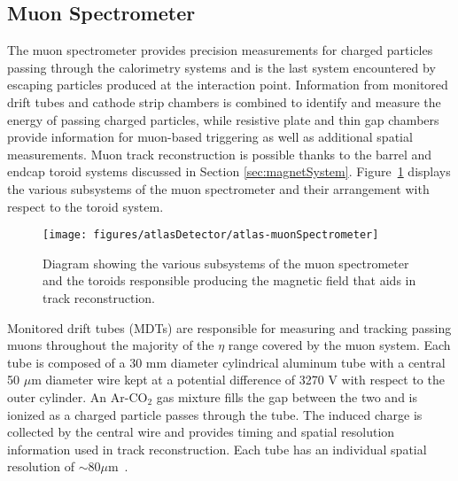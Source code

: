 
\subsection{Muon Spectrometer}
The muon spectrometer provides precision measurements for charged particles passing through the calorimetry systems and is the last system encountered by escaping particles produced at the interaction point. Information from monitored drift tubes and cathode strip chambers is combined to identify and measure the energy of passing charged particles, while resistive plate and thin gap chambers provide information for muon-based triggering as well as additional spatial measurements. Muon track reconstruction is possible thanks to the barrel and endcap toroid systems discussed in Section \ref{sec:magnetSystem}. Figure~\ref{fig:atlas-muonSpectrometer} displays the various subsystems of the muon spectrometer and their arrangement with respect to the toroid system.

\begin{figure}[h!]
\centering
\label{fig:atlas-muonSpectrometer}
\texttt{[image: figures/atlasDetector/atlas-muonSpectrometer]}
\caption{Diagram showing the various subsystems of the muon spectrometer and the toroids responsible producing the magnetic field that aids in track reconstruction.}
\end{figure}

Monitored drift tubes (MDTs) are responsible for measuring and tracking passing muons throughout the majority of the $\eta$ range covered by the muon system. Each tube is composed of a 30 mm diameter cylindrical aluminum tube with a central 50 $\mu$m diameter wire kept at a potential difference of 3270 V with respect to the outer cylinder. An Ar-CO$_2$ gas mixture fills the gap between the two and is ionized as a charged particle passes through the tube. The induced charge is collected by the central wire and provides timing and spatial resolution information used in track reconstruction. Each tube has an individual spatial resolution of $\sim$80$\mu$m~\cite{muonTDR}.

